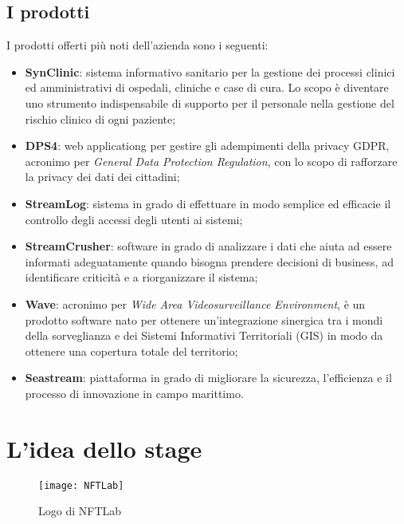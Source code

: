 \subsection{I prodotti}
\label{subsec:prodotti}

I prodotti offerti più noti dell'azienda sono i seguenti:
\begin{itemize}
	\item \textbf{SynClinic}: sistema informativo sanitario per la gestione dei processi clinici ed amministrativi di ospedali, cliniche e case di cura. Lo scopo è diventare uno strumento indispensabile di supporto per il personale nella gestione del rischio clinico di ogni paziente;
	\item \textbf{DPS4}: \gls{web applicationg} per gestire gli adempimenti della privacy GDPR, acronimo per \textit{General Data Protection Regulation}, con lo scopo di rafforzare la privacy dei dati dei cittadini;
	\item \textbf{StreamLog}: sistema in grado di effettuare in modo semplice ed efficacie il controllo degli accessi degli utenti ai sistemi;
	\item \textbf{StreamCrusher}: software in grado di analizzare i dati che aiuta ad essere informati adeguatamente quando bisogna prendere decisioni di business, ad identificare criticità e a riorganizzare il sistema;
	\item \textbf{Wave}: acronimo per \textit{Wide Area Videosurveillance Environment}, è un prodotto software nato per ottenere un'integrazione sinergica tra i mondi della sorveglianza e dei Sistemi Informativi Territoriali (GIS) in modo da ottenere una copertura totale del territorio;
	\item \textbf{Seastream}: piattaforma in grado di migliorare la sicurezza, l'efficienza e il processo di innovazione in campo marittimo.
\end{itemize}

\section{L'idea dello stage}
\label{subsec:idea-stage}

\begin{figure}[H]
	\begin{center}
		\texttt{[image: NFTLab]}
		\caption{Logo di NFTLab}
	\end{center}
\end{figure}


